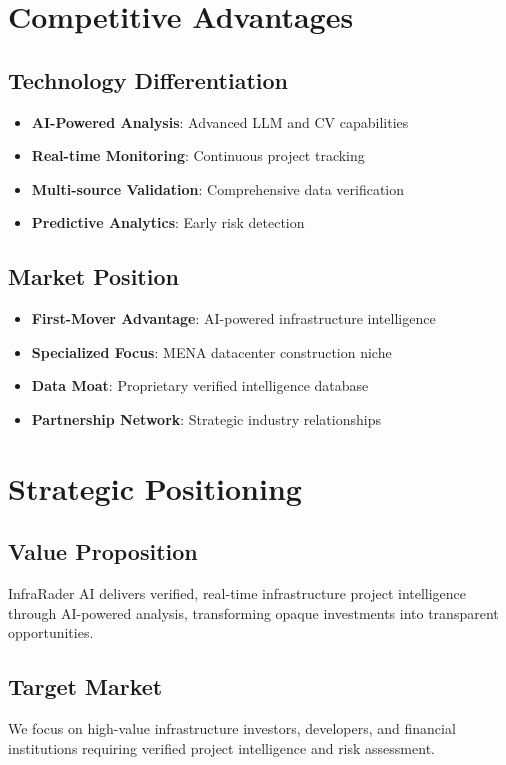 \documentclass[business]{../templates/infraradar-main}
\begin{document}
\section{Competitive Advantages}

\subsection{Technology Differentiation}
\begin{itemize}
    \item \textbf{AI-Powered Analysis}: Advanced LLM and CV capabilities
    \item \textbf{Real-time Monitoring}: Continuous project tracking
    \item \textbf{Multi-source Validation}: Comprehensive data verification
    \item \textbf{Predictive Analytics}: Early risk detection
\end{itemize}

\subsection{Market Position}
\begin{itemize}
    \item \textbf{First-Mover Advantage}: AI-powered infrastructure intelligence
    \item \textbf{Specialized Focus}: MENA datacenter construction niche
    \item \textbf{Data Moat}: Proprietary verified intelligence database
    \item \textbf{Partnership Network}: Strategic industry relationships
\end{itemize}

\section{Strategic Positioning}

\subsection{Value Proposition}
InfraRader AI delivers verified, real-time infrastructure project intelligence through AI-powered analysis, transforming opaque investments into transparent opportunities.

\subsection{Target Market}
We focus on high-value infrastructure investors, developers, and financial institutions requiring verified project intelligence and risk assessment.
\end{document}
